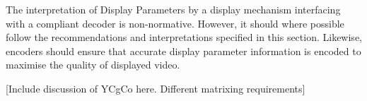 The interpretation of Display Parameters by a display mechanism
interfacing with a compliant decoder is non-normative. However, it
should where possible follow the recommendations and interpretations
specified in this section. Likewise, encoders should ensure that
accurate display parameter information is encoded to maximise the
quality of displayed video.

[Include discussion of YCgCo here. Different matrixing requirements]


